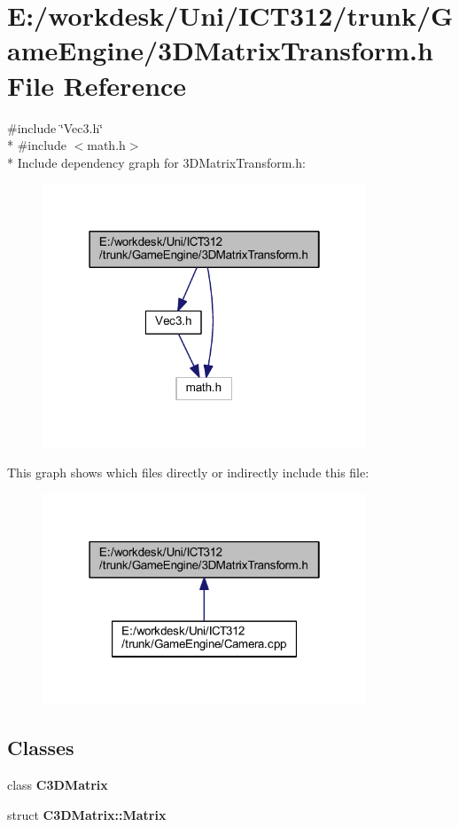 \section{E\+:/workdesk/\+Uni/\+I\+C\+T312/trunk/\+Game\+Engine/3\+D\+Matrix\+Transform.h File Reference}
\label{3_d_matrix_transform_8h}
{\ttfamily \#include \char`\"{}Vec3.\+h\char`\"{}}\\*
{\ttfamily \#include $<$math.\+h$>$}\\*
Include dependency graph for 3\+D\+Matrix\+Transform.h\+:\nopagebreak
\begin{figure}[H]
\begin{center}
\leavevmode
\includegraphics[width=274pt]{dc/d3a/3_d_matrix_transform_8h__incl}
\end{center}
\end{figure}
This graph shows which files directly or indirectly include this file\+:\nopagebreak
\begin{figure}[H]
\begin{center}
\leavevmode
\includegraphics[width=274pt]{dd/d81/3_d_matrix_transform_8h__dep__incl}
\end{center}
\end{figure}
\subsection*{Classes}
\begin{DoxyCompactItemize}
\item 
class {\bf C3\+D\+Matrix}
\item 
struct {\bf C3\+D\+Matrix\+::\+Matrix}
\end{DoxyCompactItemize}

